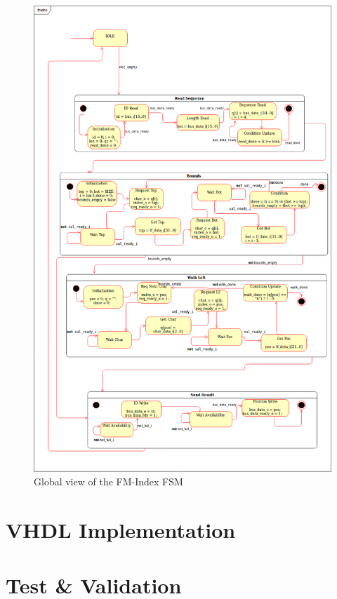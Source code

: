 \begin{figure}[H]
    \centering
    \includegraphics[scale = 0.25]{Figures/MSS.png}
    \caption{Global view of the FM-Index FSM}
    \label{fig:fsm}
\end{figure}


\section{VHDL Implementation}


\section{Test \& Validation}













